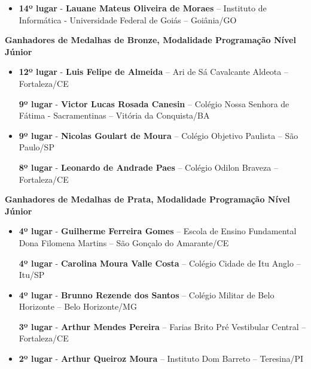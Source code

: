 \documentclass{article}
\begin{document}
\begin{itemize}
\item
\textbf{14º lugar} - \textbf{Lauane Mateus Oliveira de Moraes} – Instituto de Informática - Universidade Federal de Goiás – Goiânia/GO



\end{itemize}

\textbf{\color{blue}Ganhadores de Medalhas de Bronze, \color{black}Modalidade Programação Nível Júnior}
\color{black}

\begin{itemize}
\item
\textbf{12º lugar} - \textbf{Luis Felipe de Almeida} – Ari de Sá Cavalcante Aldeota – Fortaleza/CE


\textbf{9º lugar} - \textbf{Victor Lucas Rosada Canesin} – Colégio Nossa Senhora de Fátima - Sacramentinas – Vitória da Conquista/BA



\item
\textbf{9º lugar} - \textbf{Nicolas Goulart de Moura} – Colégio Objetivo Paulista – São Paulo/SP


\textbf{8º lugar} - \textbf{Leonardo de Andrade Paes} – Colégio Odilon Braveza – Fortaleza/CE



\end{itemize}

\textbf{\color{blue}Ganhadores de Medalhas de Prata, \color{black}Modalidade Programação Nível Júnior}
\color{black}

\begin{itemize}
\item
\textbf{4º lugar} - \textbf{Guilherme Ferreira Gomes} – Escola de Ensino Fundamental Dona Filomena Martins – São Gonçalo do Amarante/CE


\textbf{4º lugar} - \textbf{Carolina Moura Valle Costa} – Colégio Cidade de Itu Anglo – Itu/SP



\item
\textbf{4º lugar} - \textbf{Brunno Rezende dos Santos} – Colégio Militar de Belo Horizonte – Belo Horizonte/MG


\textbf{3º lugar} - \textbf{Arthur Mendes Pereira} – Farias Brito Pré Vestibular Central – Fortaleza/CE



\item
\textbf{2º lugar} - \textbf{Arthur Queiroz Moura} – Instituto Dom Barreto – Teresina/PI



\end{itemize}
\end{document}
